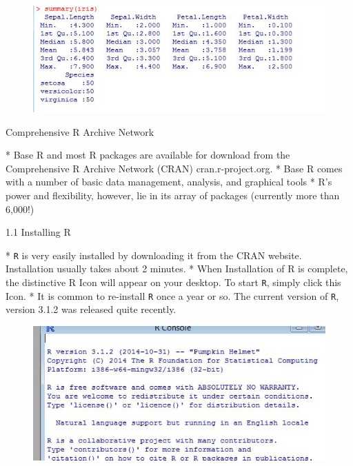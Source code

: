 \documentclass{beamer}
\begin{document}
 
\begin{figure}
\centering
\includegraphics[width=0.7\linewidth]{images/irissummary}
\caption{}
\label{fig:irissummary}
\end{figure}
    
 
 
 
{Comprehensive R Archive Network}
 
 *  Base R and most R packages are available for download from the Comprehensive R Archive Network
 (CRAN) cran.r-project.org. 
 *  Base R comes with a number of basic data management,
 analysis, and graphical tools 
 *  R’s power and flexibility, however, lie in its array of packages
 (currently more than 6,000!)

 
 
 
{1.1 Installing R}
 
 *  \texttt{R} is very easily installed by downloading it from the CRAN website. Installation usually takes
 about 2 minutes. 
 *  When Installation of R is complete, the distinctive R Icon will appear on your
 desktop. To start \texttt{R}, simply click this Icon. 
 *  It is common to re-install \texttt{R} once a year or so. The
 current version of \texttt{R}, version 3.1.2 was released quite recently.

 
 
 
 
 
 \begin{figure}
 \centering
 \includegraphics[width=0.7\linewidth]{images/Rversion}        
 \end{figure}
   
\end{document}
